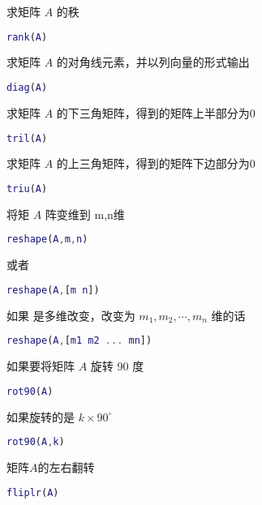 \documentclass{ctexart}
\begin{document}
 求矩阵 $A$ 的秩
 \begin{lstlisting}[language=matlab]
 rank(A)
 \end{lstlisting}

 求矩阵 $A$ 的对角线元素，并以列向量的形式输出
 \begin{lstlisting}[language=matlab]
 diag(A)
 \end{lstlisting}

 求矩阵 $A$ 的下三角矩阵，得到的矩阵上半部分为0
 \begin{lstlisting}[language=matlab]
 tril(A)
 \end{lstlisting}

 求矩阵 $A$ 的上三角矩阵，得到的矩阵下边部分为0
 \begin{lstlisting}[language=matlab]
 triu(A)
 \end{lstlisting}

 将矩 $A$ 阵变维到 m,n维
 \begin{lstlisting}[language=matlab]
 reshape(A,m,n)
 \end{lstlisting}
 或者
 \begin{lstlisting}[language=matlab]
 reshape(A,[m n])
 \end{lstlisting}
 如果 是多维改变，改变为 $m_1,m_2,\cdots,m_n$ 维的话
 \begin{lstlisting}[language=matlab]
 reshape(A,[m1 m2 ... mn])
 \end{lstlisting}

 如果要将矩阵 $A$ 旋转 90 度
 \begin{lstlisting}[language=matlab]
 rot90(A)
 \end{lstlisting}
 如果旋转的是 $k\times 90^\circ$
 \begin{lstlisting}[language=matlab]
 rot90(A,k)
 \end{lstlisting}

 矩阵$A$的左右翻转
 \begin{lstlisting}[language=matlab]
 fliplr(A)
 \end{lstlisting}














 \begin{lstlisting}[language=matlab]

 \end{lstlisting}
\end{document}
